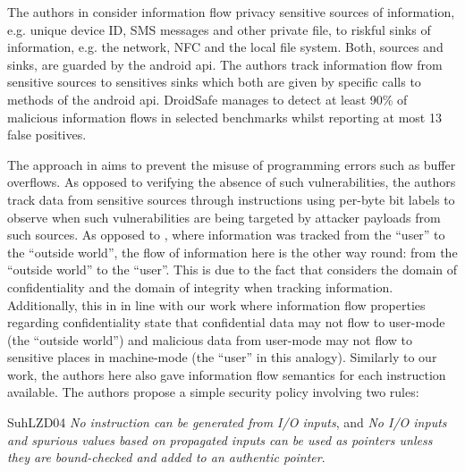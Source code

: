 The authors in \cite{GordonKPGNR15} consider information flow privacy sensitive sources of information, e.g. unique device ID, SMS messages and other private file, to riskful sinks of information, e.g. the network, NFC and the local file system.
Both, sources and sinks, are guarded by the android \gls{api}.
The authors track information flow from sensitive sources to sensitives sinks which both are given by specific calls to methods of the android \gls{api}.
DroidSafe manages to detect at least 90\% of malicious information flows in selected benchmarks whilst reporting at most 13 false positives.

The approach in \cite{SuhLZD04} aims to prevent the misuse of programming errors such as buffer overflows.
As opposed to verifying the absence of such vulnerabilities, the authors track data from sensitive sources through instructions using per-byte bit labels to observe when such vulnerabilities are being targeted by attacker payloads from such sources.
As opposed to \cite{GordonKPGNR15}, where information was tracked from the \enquote{user} to the \enquote{outside world}, the flow of information here is the other way round: from the \enquote{outside world} to the \enquote{user}.
This is due to the fact that \cite{GordonKPGNR15} considers the domain of confidentiality and \cite{SuhLZD04} the domain of integrity when tracking information.
Additionally, this in in line with our work where information flow properties regarding confidentiality state that confidential data may not flow to user-mode (the \enquote{outside world}) and malicious data from user-mode may not flow to sensitive places in machine-mode (the \enquote{user} in this analogy).
Similarly to our work, the authors here also gave information flow semantics for each instruction available.
The authors propose a simple security policy involving two rules:
\begin{displaycquote}{SuhLZD04}
    \textit{No instruction can be generated from I/O inputs}, and \textit{No I/O inputs and spurious values based on propagated inputs can be used as pointers unless they are bound-checked and added to an authentic pointer}.
\end{displaycquote}

